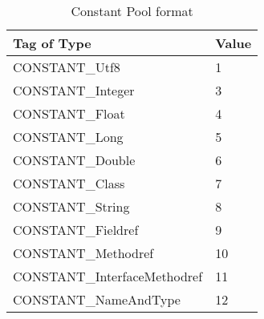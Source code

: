 \begin{table}
\centering
\begin{tabular}{l|l}
Tag of Type & Value \\
\hline\hline
CONSTANT\_Utf8 & 1 \\
CONSTANT\_Integer & 3 \\
CONSTANT\_Float & 4 \\
CONSTANT\_Long & 5 \\
CONSTANT\_Double & 6 \\
CONSTANT\_Class & 7 \\
CONSTANT\_String & 8 \\
CONSTANT\_Fieldref & 9 \\
CONSTANT\_Methodref & 10 \\
CONSTANT\_InterfaceMethodref & 11 \\
CONSTANT\_NameAndType & 12 \\
\hline
\end{tabular}
\caption{Constant Pool format}\label{tab:constantpooltype}
\end{table}
